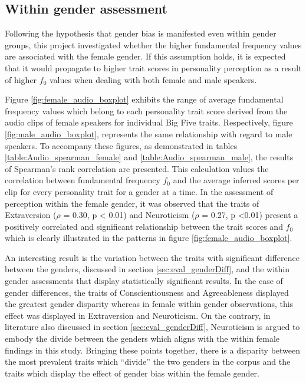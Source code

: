 \documentclass{l4proj}
\begin{document}
\subsection{Within gender assessment}

Following the hypothesis that gender bias is manifested even within gender groups, this project investigated whether the higher fundamental frequency values are associated with the female gender. If this assumption holds, it is expected that it would propagate to higher trait scores in personality perception as a result of higher $f_0$ values when dealing with both female and male speakers.

Figure \ref{fig:female_audio_boxplot} exhibits the range of average fundamental frequency values which belong to each personality trait score derived from the audio clips of female speakers for individual Big Five traits. 
Respectively, figure \ref{fig:male_audio_boxplot}, represents the same relationship with regard to male speakers.
To accompany these figures, as demonstrated in tables \ref{table:Audio_spearman_female} and \ref{table:Audio_spearman_male}, the results of Spearman’s rank correlation are presented. This calculation values the correlation between fundamental frequency $f_0$ and the average inferred scores per clip for every personality trait for a gender at a time.
In the assessment of perception within the female gender, it was observed that the traits of Extraversion ($\rho$ = 0.30, p < 0.01) and Neuroticism ($\rho$ = 0.27, p <0.01) present a positively correlated and significant relationship between the trait scores and $f_0$ which is clearly illustrated in the patterns in figure \ref{fig:female_audio_boxplot}. 

An interesting result is the variation between the traits with significant difference between the genders, discussed in section \ref{sec:eval_genderDiff}, and the within gender assessments that display statistically significant results. In the case of gender differences, the traits of Conscientiousness and Agreeableness displayed the greatest gender disparity whereas in female within gender observations, this effect was displayed in Extraversion and Neuroticism. On the contrary, in literature also discussed in section \ref{sec:eval_genderDiff}, Neuroticism is argued to embody the divide between the genders which aligns with the within female findings in this study. Bringing these points together, there is a disparity between the most prevalent traits which “divide” the two genders in the corpus and the traits which display the effect of gender bias within the female gender.
\end{document}

